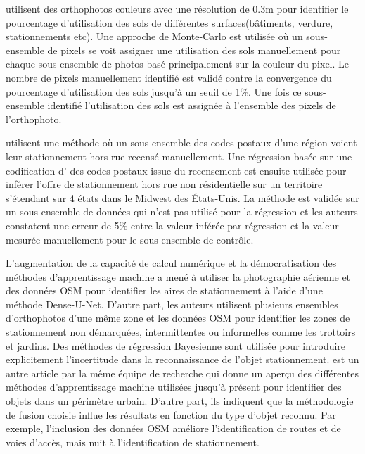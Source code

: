 \textcite{Akbari:AnalyzingLand:2003} utilisent des orthophotos couleurs avec une résolution de 0.3m pour identifier le pourcentage d'utilisation des sols de différentes surfaces(bâtiments, verdure, stationnements etc). Une approche de Monte-Carlo est utilisée où un sous-ensemble de pixels se voit assigner une utilisation des sols manuellement pour chaque sous-ensemble de photos basé principalement sur la couleur du pixel. Le nombre de pixels manuellement identifié est validé contre la convergence du pourcentage d'utilisation des sols jusqu'à un seuil de 1\%. Une fois ce sous-ensemble identifié l'utilisation des sols est assignée à l'ensemble des pixels de l'orthophoto. \par
\textcite{Davis:EstimatingParking:2010} utilisent une méthode où un sous ensemble des codes postaux d'une région voient leur stationnement hors rue recensé manuellement. Une régression basée sur une codification d' \fg{} des codes postaux issue du recensement est ensuite utilisée pour inférer l'offre de stationnement hors rue non résidentielle sur un territoire s'étendant sur 4 états dans le Midwest des États-Unis. La méthode est validée sur un sous-ensemble de données qui n'est pas utilisé pour la régression et les auteurs constatent une erreur de 5\% entre la valeur inférée par régression et la valeur mesurée manuellement pour le sous-ensemble de contrôle. \par
L'augmentation de la capacité de calcul numérique et la démocratisation des méthodes d'apprentissage machine a mené \textcite{Hellekes:ParkingSpace:2023} à utiliser la photographie aérienne et des données \ac{OSM} pour identifier les aires de stationnement à l'aide d'une méthode Dense-U-Net. D'autre part, les auteurs utilisent plusieurs ensembles d'orthophotos d'une même zone et les données \ac{OSM} pour identifier les zones de stationnement non démarquées, intermittentes ou informelles comme les trottoirs et jardins. Des méthodes de régression Bayesienne sont utilisée pour introduire explicitement l'incertitude dans la reconnaissance de l'objet stationnement. \textcite{Henry:CitywideEstimation:2021} est un autre article par la même équipe de recherche qui donne un aperçu des différentes méthodes d'apprentissage machine utilisées jusqu'à présent pour identifier des objets dans un périmètre urbain. D'autre part, ils indiquent que la méthodologie de fusion choisie influe les résultats en fonction du type d'objet reconnu. Par exemple, l'inclusion des données \ac{OSM} améliore l'identification de routes et de voies d'accès, mais nuit à l'identification de stationnement.  \par

